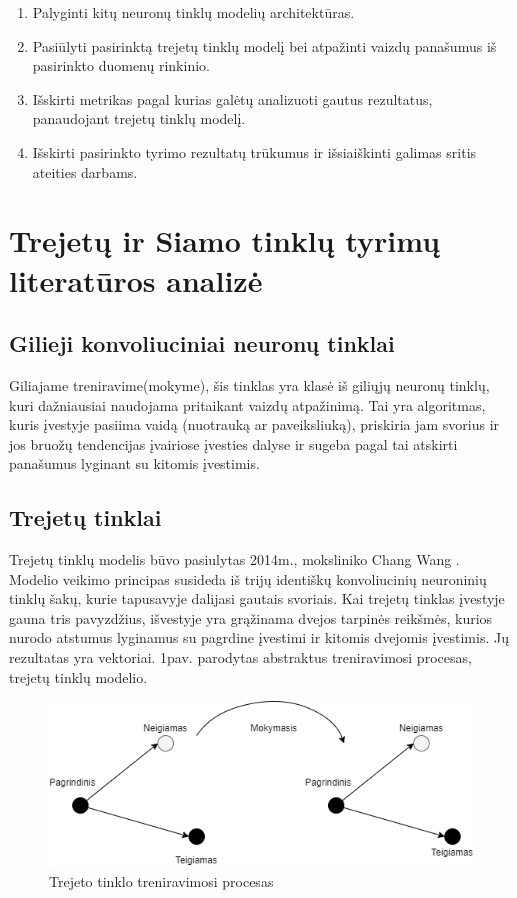\documentclass{VUMIFPSkursinis}
\begin{document}
\pagebreak
 
\thispagestyle{empty}
\begin{enumerate}
\item{Palyginti kitų neuronų tinklų modelių architektūras.}
\item{Pasiūlyti pasirinktą trejetų tinklų modelį bei atpažinti vaizdų panašumus iš pasirinkto duomenų rinkinio.}
\item{ Išskirti metrikas pagal kurias galėtų analizuoti gautus rezultatus, panaudojant trejetų tinklų modelį.}
\item{Išskirti pasirinkto tyrimo rezultatų trūkumus ir išsiaiškinti galimas sritis ateities darbams.}
\end{enumerate}

\pagebreak
\section{Trejetų ir Siamo tinklų tyrimų literatūros analizė}

\subsection{Gilieji konvoliuciniai neuronų tinklai}
Giliajame treniravime(mokyme), šis tinklas yra klasė iš giliųjų neuronų tinklų, kuri dažniausiai naudojama pritaikant vaizdų atpažinimą. Tai yra algoritmas, kuris įvestyje pasiima vaidą (nuotrauką ar paveiksliuką), priskiria jam svorius ir jos bruožų tendencijas įvairiose įvesties dalyse ir sugeba pagal tai atskirti panašumus lyginant su kitomis įvestimis.

\subsection{Trejetų tinklai}
Trejetų tinklų modelis būvo pasiulytas 2014m., moksliniko Chang Wang \cite{Learning_fine_grained_image}. Modelio veikimo principas susideda iš trijų identiškų konvoliucinių neuroninių tinklų šakų, kurie tapusavyje dalijasi gautais svoriais. Kai trejetų tinklas įvestyje gauna tris pavyzdžius, išvestyje yra grąžinama dvejos tarpinės reikšmės, kurios nurodo atstumus lyginamus su pagrdine įvestimi ir kitomis dvejomis įvestimis. Jų rezultatas yra vektoriai. 1pav. parodytas abstraktus treniravimosi procesas, trejetų tinklų modelio.
\begin{figure}[H]
\centering
\includegraphics[scale=0.5]{img/Triplet_network}
\caption{Trejeto tinklo treniravimosi procesas \cite{Improved_triplet_network}} %
\label{img:mlp}
\end{figure}
\pagebreak
\end{document}
